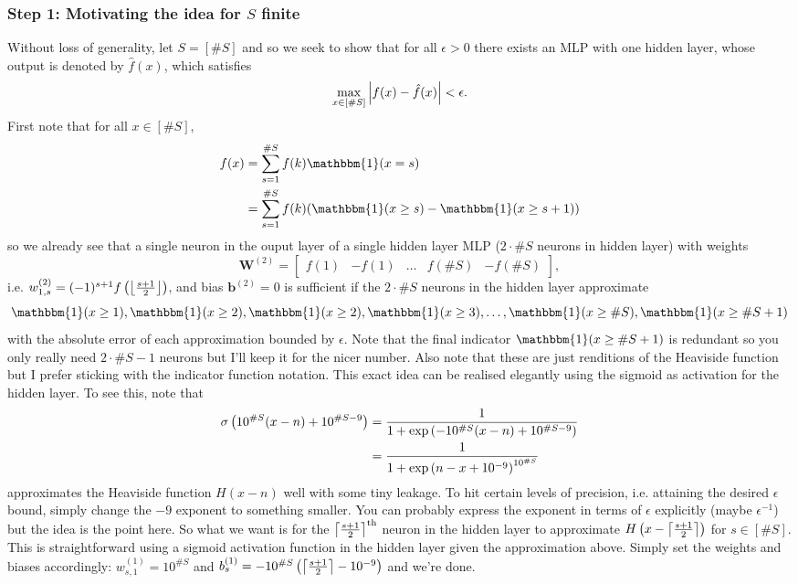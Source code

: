 \documentclass[11pt]{article}
\begin{document}
\subsubsection*{Step 1: Motivating the idea for $S$ finite}
Without loss of generality, let $S=[\#S]$ and so we seek to show that for all $\epsilon>0$ there exists an MLP with one hidden layer, whose output is denoted by $\hat{f}(x)$, which satisfies
$$
\max_{x\in [\#S]}\left|f(x)-\hat{f}(x)\right|<\epsilon.
$$
First note that for all $x\in[\#S]$,
\begin{align*}
f(x)
&=
\sum_{s=1}^{\#S}f(k)\mathbbm{1}(x=s)\\
&=
\sum_{s=1}^{\#S}f(k)(\mathbbm{1}(x\geq s)-\mathbbm{1}(x\geq s+1))
\end{align*}
so we already see that a single neuron in the ouput layer of a single hidden layer MLP ($2\cdot\#S$ neurons in hidden layer) with weights
$$
\mathbf{W}^{(2)}
=
\begin{bmatrix}
    f(1) & -f(1) & \dots & f(\#S) & -f(\#S)
\end{bmatrix},
$$
i.e. $w_{1,s}^{(2)}=(-1)^{s+1}f\left(\left\lfloor\frac{s+1}{2}\right\rfloor\right)$, and bias $\mathbf{b}^{(2)}=0$ is sufficient if the $2\cdot\#S$ neurons in the hidden layer approximate
$$
\mathbbm{1}(x\geq1),\mathbbm{1}(x\geq2),\mathbbm{1}(x\geq2),\mathbbm{1}(x\geq3),\dots,\mathbbm{1}(x\geq\#S),\mathbbm{1}(x\geq\#S+1)
$$
with the absolute error of each approximation bounded by $\epsilon$. Note that the final indicator $\mathbbm{1}(x\geq\#S+1)$ is redundant so you only really need $2\cdot\#S-1$ neurons but I'll keep it for the nicer number. Also note that these are just renditions of the Heaviside function but I prefer sticking with the indicator function notation. This exact idea can be realised elegantly using the sigmoid as activation for the hidden layer. To see this, note that
\begin{align*}
    \sigma\left(10^{\#S}(x-n)+10^{\#S-9}\right)
    &=
    \frac{1}{1+\exp\left(-10^{\#S}(x-n)+10^{\#S-9}\right)}\\
    &=
    \frac{1}{1+\exp\left(n-x+10^{-9}\right)^{10^{\#S}}}
\end{align*}
approximates the Heaviside function $H(x-n)$ well with some tiny leakage. To hit certain levels of precision, i.e. attaining the desired $\epsilon$ bound, simply change the $-9$ exponent to something smaller. You can probably express the exponent in terms of $\epsilon$ explicitly (maybe $\epsilon^{-1}$) but the idea is the point here. So what we want is for the $\left\lceil\frac{s+1}{2}\right\rceil^{\text{th}}$ neuron in the hidden layer to approximate $H\left(x-\left\lceil\frac{s+1}{2}\right\rceil\right)$ for $s\in[\#S]$. This is straightforward using a sigmoid activation function in the hidden layer given the approximation above. Simply set the weights and biases accordingly: $w_{s,1}^{(1)}=10^{\#S}$ and $b_s^{(1)}=-10^{\#S}\left(\left\lceil\frac{s+1}{2}\right\rceil-10^{-9}\right)$ and we're done.
\end{document}
